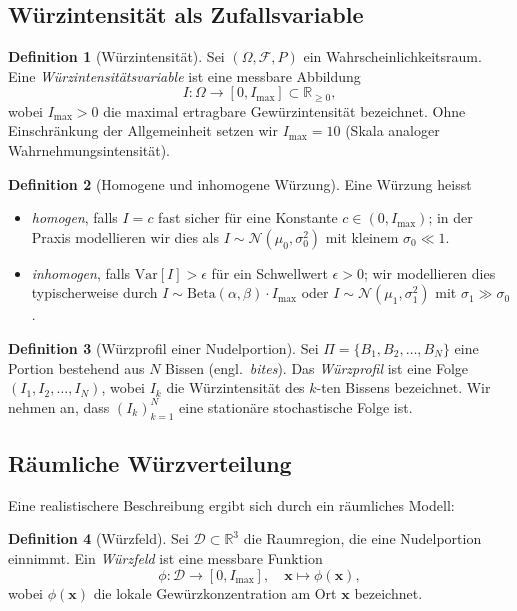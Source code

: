 ﻿\documentclass[12pt,a4paper]{article}
\theoremstyle{definition}
\newtheorem{definition}{Definition}[section]
\newcommand{\R}{\mathbb{R}}
\newcommand{\Var}{\mathrm{Var}}
\newcommand{\bx}{\mathbf{x}}
\begin{document}
\subsection{Würzintensität als Zufallsvariable}

\begin{definition}[Würzintensität]\label{def:würz}
Sei $(\Omega, \mathcal{F}, P)$ ein Wahrscheinlichkeitsraum. Eine
\emph{Würzintensitätsvariable} ist eine messbare Abbildung
\[
  I: \Omega \longrightarrow [0, I_{\max}] \subset \R_{\geq 0},
\]
wobei $I_{\max} > 0$ die maximal ertragbare Gewürzintensität bezeichnet.
Ohne Einschränkung der Allgemeinheit setzen wir $I_{\max} = 10$ (Skala
analoger Wahrnehmungsintensität).
\end{definition}

\begin{definition}[Homogene und inhomogene Würzung]\label{def:hominhom}
Eine Würzung heisst
\begin{itemize}
  \item \emph{homogen}, falls $I = c$ fast sicher für eine Konstante $c \in (0, I_{\max})$;
  in der Praxis modellieren wir dies als $I \sim \mathcal{N}(\mu_0, \sigma_0^2)$
  mit kleinem $\sigma_0 \ll 1$.
  \item \emph{inhomogen}, falls $\Var[I] > \epsilon$ für ein
  Schwellwert $\epsilon > 0$; wir modellieren dies typischerweise durch
  $I \sim \mathrm{Beta}(\alpha, \beta) \cdot I_{\max}$ oder
  $I \sim \mathcal{N}(\mu_1, \sigma_1^2)$ mit $\sigma_1 \gg \sigma_0$.
\end{itemize}
\end{definition}

\begin{definition}[Würzprofil einer Nudelportion]
Sei $\Pi = \{B_1, B_2, \ldots, B_N\}$ eine Portion bestehend aus $N$
Bissen (engl.\ \emph{bites}). Das \emph{Würzprofil} ist eine Folge
$(I_1, I_2, \ldots, I_N)$, wobei $I_k$ die Würzintensität des $k$-ten
Bissens bezeichnet. Wir nehmen an, dass $(I_k)_{k=1}^N$ eine stationäre
stochastische Folge ist.
\end{definition}

\subsection{Räumliche Würzverteilung}

Eine realistischere Beschreibung ergibt sich durch ein räumliches Modell:

\begin{definition}[Würzfeld]
Sei $\mathcal{D} \subset \R^3$ die Raumregion, die eine Nudelportion
einnimmt. Ein \emph{Würzfeld} ist eine messbare Funktion
\[
  \phi: \mathcal{D} \longrightarrow [0, I_{\max}],
  \quad \bx \mapsto \phi(\bx),
\]
wobei $\phi(\bx)$ die lokale Gewürzkonzentration am Ort $\bx$
bezeichnet.
\end{definition}
\end{document}
